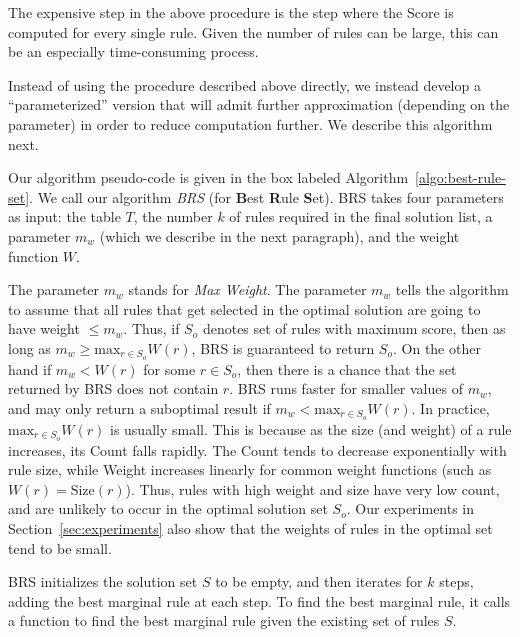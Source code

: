 The expensive step in the above procedure is the step where the Score is computed for every
single rule. Given the number of rules can be large, this can be an especially time-consuming process.

Instead of using the procedure described above directly, we instead develop a ``parameterized'' version 
that will admit further approximation (depending on the parameter) in order to reduce computation further. We describe
this algorithm next.

 Our algorithm pseudo-code is given in the box labeled Algorithm~\ref{algo:best-rule-set}. We call our algorithm {\em BRS} (for \textbf{B}est \textbf{R}ule \textbf{S}et). BRS takes four parameters as input: the table $T$, the number $k$ of rules required in the final solution list, a parameter $m_w$ (which we describe in the next paragraph), and the weight function $W$. 

The parameter $m_w$ stands for \textit{Max Weight}. The parameter $m_w$ tells the algorithm to assume that all rules that get selected in the optimal solution are going to have weight $\leq m_w$. Thus, if $S_o$ denotes set of rules with maximum score, then as long as $m_w \geq \textrm{max}_{r \in S_o}W(r)$, BRS is guaranteed to return $S_o$. On the other hand if $m_w < W(r)$ for some $r \in S_o$, then there is a chance that the set returned by BRS does not contain $r$. BRS runs faster for smaller values of $m_w$, and may only return a suboptimal result if $m_w < \textrm{max}_{r \in S_o}W(r)$. In practice, $\textrm{max}_{r \in S_o}W(r)$ is usually small. This is because as the size (and weight) of a rule increases, its Count falls rapidly. The Count tends to decrease exponentially with rule size, while Weight increases linearly for common weight functions (such as $W(r) = \text{Size}(r)$). Thus, rules with high weight and size have very low count, and are unlikely to occur in the optimal solution set $S_o$. Our experiments in Section~\ref{sec:experiments} also show that the weights of rules in the optimal set tend to be small. 


BRS initializes the solution set $S$ to be empty, and then iterates for $k$ steps, adding the best marginal rule at each step. To find the best marginal rule, it calls a function to find the best marginal rule given the existing set of rules $S$. 

